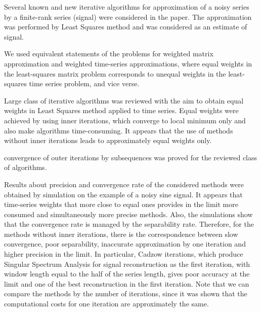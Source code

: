 \documentclass[sii]{ipart}
\begin{document}
Several known and new iterative algorithms for approximation of a noisy series by a finite-rank series (signal) were considered in the paper. The approximation was performed by Least Squares method and was considered as an estimate of signal.

 We used equivalent statements of the problems for weighted matrix approximation and  weighted time-series approximations, where equal weights in the least-squares matrix problem corresponds
 to unequal weights in the least-squares time series problem, and vice verse.

Large class of iterative algorithms was reviewed with the aim to obtain equal weights in Least Squares method applied to time series.
Equal weights were achieved by using inner iterations, which converge to local minimum only and also make algorithms time-consuming. It appears that the use of methods without inner iterations leads to approximately equal weights only.

convergence of outer iterations by subsequences was proved for the reviewed class of algorithms.

Results about precision and convergence rate of the considered methods were obtained by simulation on the example of a noisy sine signal. It appears that time-series weights that more close to equal ones provides in the limit more consumed and simultaneously more precise methods.
Also, the simulations show that the convergence rate is managed by
the separability rate. Therefore, for the methods without inner iterations,
there is the correspondence between slow convergence, poor separability,
inaccurate approximation by one iteration and higher precision in the limit.
In particular, Cadzow iterations, which produce Singular Spectrum Analysis for signal reconstruction as the first iteration, with window length equal
to the half of the series length, gives poor accuracy at the limit and
one of the best reconstruction in the first iteration.
Note that we can compare the methods by the number of iterations, since
it was shown that the computational costs for one iteration are approximately the same.



\end{document}
